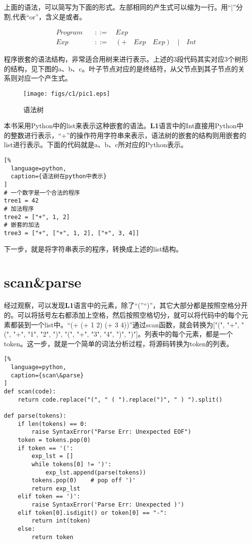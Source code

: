 上面的语法，可以简写为下面的形式。左部相同的产生式可以缩为一行。用“|”分割,代表“or”，含义是或者。

\begin{equation}
\begin{aligned}
  \label{eq:2}
   Program \quad &::= \quad Exp \\
   Exp \quad &::= \quad (+ \quad Exp \quad Exp) \quad | \quad Int
\end{aligned}
\end{equation}

程序嵌套的语法结构，非常适合用树来进行表示。上述的3段代码其实对应3个树形的结构，见下图的a、b、c。叶子节点对应的是终结符，从父节点到其子节点的关系则对应一个产生式。

\begin{figure}[ht]
\centering
\texttt{[image: figs/c1/pic1.eps]}
\caption{语法树}
\label{fig:fig1}
\end{figure}

本书采用Python中的list来表示这种嵌套的语法。\textbf{L1}语言中的Int直接用Python中的整数进行表示，“+”的操作符用字符串来表示，语法树的嵌套的结构则用嵌套的list进行表示。下面的代码就是a、b、c所对应的Python表示。

\begin{lstlisting}[%
  language=python,
  caption={语法树在python中表示}
]
# 一个数字是一个合法的程序
tree1 = 42
# 加法程序
tree2 = ["+", 1, 2]
# 嵌套的加法
tree3 = ["+", ["+", 1, 2], ["+", 3, 4]]
\end{lstlisting}

下一步，就是将字符串表示的程序，转换成上述的list结构。


\section{scan\&parse}

经过观察，可以发现\textbf{L1}语言中的元素，除了“(”“)”，其它大部分都是按照空格分开的。可以将括号左右都添加上空格，然后按照空格切分，就可以将代码中的每个元素都装到一个list中。“(+ (+ 1 2) (+ 3 4))”通过scan函数，就会转换为["(", "+", "(", "+", "1", "2", ")", "(", "+", "3", "4", ")", ")"]。列表中的每个元素，都是一个token。这一步，就是一个简单的词法分析过程，将源码转换为token的列表。

\begin{lstlisting}[%
  language=python,
  caption={scan\&parse}
]
def scan(code):
    return code.replace("(", " ( ").replace(")", " ) ").split()

def parse(tokens):
    if len(tokens) == 0:
        raise SyntaxError("Parse Err: Unexpected EOF")
    token = tokens.pop(0)
    if token == '(':
        exp_lst = []
        while tokens[0] != ')':
            exp_lst.append(parse(tokens))
        tokens.pop(0)    # pop off ')'
        return exp_lst
    elif token == ')':
        raise SyntaxError('Parse Err: Unexpected )')
    elif token[0].isdigit() or token[0] == "-":
        return int(token)
    else:
        return token
\end{lstlisting}


